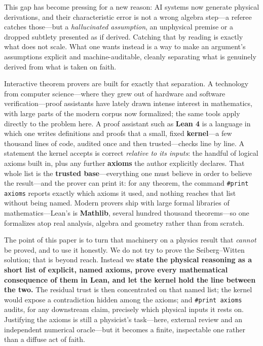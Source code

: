 \documentclass[11pt]{article}
\newcommand{\code}[1]{\texttt{#1}}
\begin{document}
This gap has become pressing for a new reason: AI systems now generate physical derivations, and
their characteristic error is not a wrong algebra step---a referee catches those---but a
\emph{hallucinated assumption}, an unphysical premise or a dropped subtlety presented as if derived.
Catching that by reading is exactly what does not scale. What one wants instead is a way to make an
argument's assumptions explicit and machine-auditable, cleanly separating what is genuinely derived
from what is taken on faith.

Interactive theorem provers are built for exactly that separation. A technology from computer
science---where they grew out of hardware and software verification---proof assistants have lately
drawn intense interest in mathematics, with large parts of the modern corpus now formalized; the
same tools apply directly to the problem here. A proof assistant such as \textbf{Lean 4} is a
language in which one writes definitions and proofs that a small, fixed \textbf{kernel}---a few
thousand lines of code, audited once and then trusted---checks line by line. A statement the kernel accepts is correct \emph{relative to its
inputs}: the handful of logical axioms built in, plus any further \textbf{axioms} the author
explicitly declares. That whole list is the \textbf{trusted base}---everything one must believe in
order to believe the result---and the prover can print it: for any theorem, the command
\code{\#print axioms} reports exactly which axioms it used, and nothing reaches that list without
being named. Modern provers ship with large formal libraries of mathematics---Lean's is
\textbf{Mathlib}, several hundred thousand theorems---so one formalizes atop real analysis, algebra
and geometry rather than from scratch.

The point of this paper is to turn that machinery on a physics result that \emph{cannot} be proved,
and to use it honestly. We do not try to prove the Seiberg--Witten solution; that is beyond reach.
Instead we \textbf{state the physical reasoning as a short list of explicit, named axioms, prove
every mathematical consequence of them in Lean, and let the kernel hold the line between the two.}
The residual trust is then concentrated on that named list; the kernel would expose a contradiction
hidden among the axioms; and \code{\#print axioms} audits, for any downstream claim, precisely which
physical inputs it rests on. Justifying the axioms is still a physicist's task---here, external
review and an independent numerical oracle---but it becomes a finite, inspectable one rather than a
diffuse act of faith.
\end{document}
